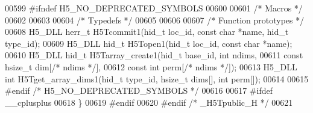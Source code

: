 \begin{DoxyCode}
00599 \textcolor{preprocessor}{#ifndef H5\_NO\_DEPRECATED\_SYMBOLS}
00600 
00601 \textcolor{comment}{/* Macros */}
00602 
00603 
00604 \textcolor{comment}{/* Typedefs */}
00605 
00606 
00607 \textcolor{comment}{/* Function prototypes */}
00608 H5\_DLL herr\_t H5Tcommit1(hid\_t loc\_id, \textcolor{keyword}{const} \textcolor{keywordtype}{char} *name, hid\_t type\_id);
00609 H5\_DLL hid\_t H5Topen1(hid\_t loc\_id, \textcolor{keyword}{const} \textcolor{keywordtype}{char} *name);
00610 H5\_DLL hid\_t H5Tarray\_create1(hid\_t base\_id, \textcolor{keywordtype}{int} ndims,
00611             \textcolor{keyword}{const} hsize\_t dim[\textcolor{comment}{/* ndims */}],
00612             \textcolor{keyword}{const} \textcolor{keywordtype}{int} perm[\textcolor{comment}{/* ndims */}]);
00613 H5\_DLL \textcolor{keywordtype}{int} H5Tget\_array\_dims1(hid\_t type\_id, hsize\_t dims[], \textcolor{keywordtype}{int} perm[]);
00614 
00615 \textcolor{preprocessor}{#endif }\textcolor{comment}{/* H5\_NO\_DEPRECATED\_SYMBOLS */}\textcolor{preprocessor}{}
00616 
00617 \textcolor{preprocessor}{#ifdef \_\_cplusplus}
00618 \}
00619 \textcolor{preprocessor}{#endif}
00620 \textcolor{preprocessor}{#endif }\textcolor{comment}{/* \_H5Tpublic\_H */}\textcolor{preprocessor}{}
00621 
\end{DoxyCode}
